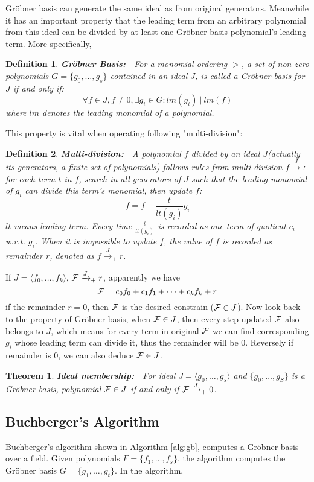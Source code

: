 \documentclass[conference,10pt]{IEEEtran}
\newtheorem{Definition}{Definition}[section]
\newtheorem{Theorem}{Theorem}[section]
\begin{document}
Gr\"obner basis can generate the same ideal as from original generators. Meanwhile it has an important property
that the leading term from an arbitrary polynomial from this ideal can be divided by at least one Gr\"obner
basis polynomial's leading term. More specifically,
\begin{Definition}
{\bf Gr\"obner Basis:}\ \ For a monomial ordering $>$, a set of non-zero polynomials $G=\{g_0,\dots,g_s\}$
contained in an ideal $J$, is called a \emph{Gr\"obner basis} for $J$ if and only if:
$$\forall f\in J, f\neq 0, \exists g_i\in G: lm(g_i)\ |\ lm(f)$$
where $lm$ denotes the leading monomial of a polynomial.
\end{Definition}

This property is vital when operating following "multi-division":
\begin{Definition}
{\bf Multi-division:}\ \ A polynomial $f$ divided by an ideal $J$(actually its generators, a finite set of
polynomials) follows rules from multi-division $f\xrightarrow{J}$:\\
for each term $t$ in $f$, search in all generators of $J$ such that the leading monomial of $g_i$ can divide
this term's monomial, then update $f$:
$$f = f - \frac{t}{lt(g_i)}g_i$$
$lt$ means leading term. Every time $\frac{t}{lt(g_i)}$ is recorded as one term of quotient $c_i$ w.r.t. $g_i$.
When it is impossible to update $f$, the value of $f$ is recorded as \emph{remainder} $r$, denoted as
$f\xrightarrow{J}_{+}r$.
\end{Definition}

If $J = \langle f_0,\dots,f_k\rangle$, ${\mathcal{F}}\xrightarrow{J}_+r$, apparently we have
$${\mathcal{F}} = c_0f_0+c_1f_1+\cdots+c_kf_k + r$$
if the remainder $r=0$, then ${\mathcal{F}}$ is the desired constrain (${\mathcal{F}}\in J$). Now look back to the property of
Gr\"obner basis, when ${\mathcal{F}}\in J$, then every step updated ${\mathcal{F}}$ also belongs to $J$, which means for every
term in original ${\mathcal{F}}$ we can find corresponding $g_i$ whose leading term can divide it, thus the remainder
will be 0. Reversely if remainder is 0, we can also deduce ${\mathcal{F}}\in J$.

\begin{Theorem}
{\bf Ideal membership:}\ \ For ideal $J=\langle g_0,\dots,g_s\rangle$ and $\{ g_0,\dots,g_S\}$
is a Gr\"obner basis, polynomial ${\mathcal{F}}\in J$ if and only if ${\mathcal{F}}\xrightarrow{J}_+0$.
\end{Theorem}
\subsection{Buchberger's Algorithm}
\label{sec:buch}
Buchberger's algorithm
shown in Algorithm \ref{alg:gb},  computes a Gr\"obner
basis over a field. Given polynomials $F = \{f_1, \dots, f_s\}$, 
the algorithm computes the Gr\"obner basis $G = \{g_1, \dots, 
g_t\}$.
In the algorithm,  
\end{document}
